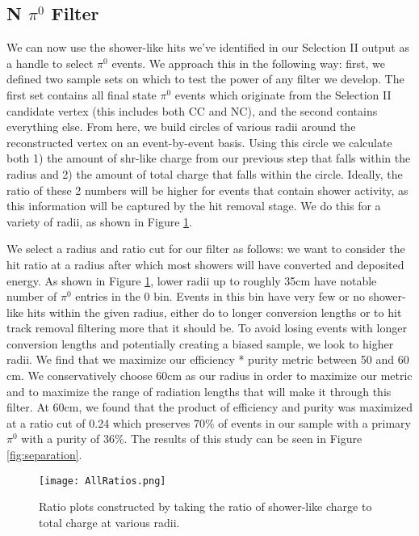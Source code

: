 \documentclass[a4paper]{article}
\begin{document}
\subsection{N $\pi^0$ Filter}
We can now use the shower-like hits we've identified in our Selection II output as a handle to select $\pi^0$ events.  We approach this in the following way: first, we defined two sample sets on which to test the power of any filter we develop. The first set contains all final state $\pi^0$ events which originate from the Selection II candidate vertex (this includes both CC and NC), and the second contains everything else.  From here, we build circles of various radii around the reconstructed vertex on an event-by-event basis. Using this circle we calculate both 1) the amount of shr-like charge from our previous step that falls within the radius and 2) the amount of total charge that falls within the circle.  Ideally, the ratio of these 2 numbers will be higher for events that contain shower activity, as this information will be captured by the hit removal stage.  We do this for a variety of radii, as shown in Figure \ref{fig:all_radii}.  
\par We select a radius and ratio cut for our filter as follows:  we want to consider the hit ratio at a radius after which most showers will have converted and deposited energy.  As shown in Figure \ref{fig:all_radii}, lower radii up to roughly 35cm have notable number of $\pi^0$ entries in the 0 bin. Events in this bin have very few or no shower-like hits within the given radius, either do to longer conversion lengths or to hit track removal filtering more that it should be. To avoid losing events with longer conversion lengths and potentially creating a biased sample, we look to higher radii. We find that we maximize our efficiency * purity metric between 50 and 60 cm. We conservatively choose 60cm as our radius in order to maximize our metric and to maximize the range of radiation lengths that will make it through this filter.  At 60cm, we found that the product of efficiency and purity was maximized at a ratio cut of 0.24 which preserves 70\% of events in our sample with a primary $\pi^0$ with a purity of 36\%. The results of this study can be seen in Figure \ref{fig:separation}.

\begin{figure}[h!]
\centering
\texttt{[image: AllRatios.png]}
\caption{Ratio plots constructed by taking the ratio of shower-like charge to total charge at various radii. }
\label{fig:all_radii}
\end{figure}
\end{document}
